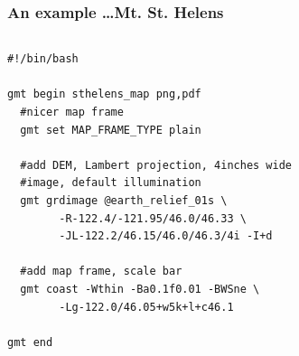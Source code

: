 \documentclass[unknownkeysallowed]{beamer}
\begin{document}
\begin{frame}[fragile=singleslide]
\frametitle{An example \dots Mt. St. Helens}
	\begin{columns}
		\tiny{
		\begin{verbatim}
#!/bin/bash

gmt begin sthelens_map png,pdf
  #nicer map frame
  gmt set MAP_FRAME_TYPE plain

  #add DEM, Lambert projection, 4inches wide 
  #image, default illumination
  gmt grdimage @earth_relief_01s \
        -R-122.4/-121.95/46.0/46.33 \
        -JL-122.2/46.15/46.0/46.3/4i -I+d

  #add map frame, scale bar
  gmt coast -Wthin -Ba0.1f0.01 -BWSne \
        -Lg-122.0/46.05+w5k+l+c46.1

gmt end		
		\end{verbatim}
}
		\begin{center}
		\end{center}
	\end{columns}
\end{frame}
\end{document}
